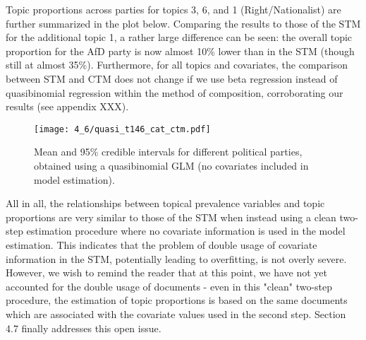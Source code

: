 \documentclass[12pt]{article}
\begin{document}
Topic proportions across parties for topics 3, 6, and 1 (Right/Nationalist) are further summarized in the plot below. Comparing the results to those of the STM for the additional topic 1, a rather large difference can be seen: the overall topic proportion for the AfD party is now almost 10\% lower than in the STM (though still at almost 35\%). Furthermore, for all topics and covariates, the comparison between STM and CTM does not change if we use beta regression instead of quasibinomial regression within the method of composition, corroborating our results (see appendix XXX).

\begin{figure}[h!]
  \centering
  \captionsetup{justification=centering,margin=2cm}
  \texttt{[image: 4\_6/quasi\_t146\_cat\_ctm.pdf]}
  \caption{Mean and 95\% credible intervals for different political parties,
obtained using a quasibinomial GLM (no covariates included in model estimation).}
  \label{fig:quasi_t146_cat_ctm}
\end{figure}

All in all, the relationships between topical prevalence variables and topic proportions are very similar to those of the STM when instead using a clean two-step estimation procedure where no covariate information is used in the model estimation. This indicates that the problem of double usage of covariate information in the STM, potentially leading to overfitting, is not overly severe. However, we wish to remind the reader that at this point, we have not yet accounted for the double usage of documents - even in this "clean" two-step procedure, the estimation of topic proportions is based on the same documents which are associated with the covariate values used in the second step. Section 4.7 finally addresses this open issue.




\end{document}
